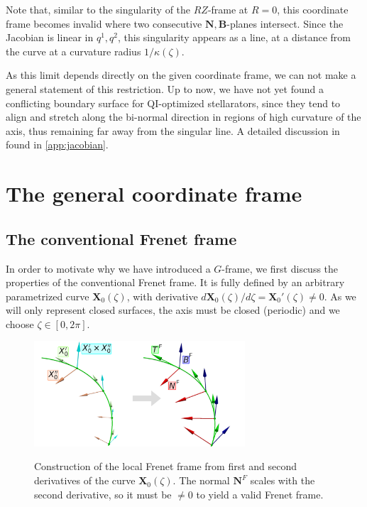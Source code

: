 \documentclass[12pt]{iopart}
\newcommand\hladdedrev[1]{#1} %
\newcommand\hlchangedrev[1]{#1} %
\newcommand\X{{\bm{X}}_0}
\newcommand\Xp{\X'}
\newcommand\Nfrenet{{\bm N}^F}
\newcommand\Nnew{{\bm N}}
\newcommand\Bnew{{\bm B}}
\newcommand\GFF{$G$-frame}
\newcommand\RZF{$RZ$-frame}
\newcommand\NBplanes[1]{$\Nnew,\Bnew$-planes{#1}}
\newcommand\binormal[1]{bi-normal{#1}}
\begin{document}
\hlchangedrev{Note that, similar to the singularity of the \RZF{} at $R=0$, this coordinate frame becomes invalid where two consecutive \NBplanes{ } intersect. Since the Jacobian is linear in $q^1,q^2$, this singularity appears as a line, at a distance from the curve at a curvature radius $1/\kappa(\zeta)$. } 

\hladdedrev{As this limit depends directly on the given coordinate frame, we can not make a general statement of this restriction. Up to now, we have not yet found a conflicting boundary surface for QI-optimized stellarators, since they tend to align and stretch along the \binormal{ } direction in regions of high curvature of the axis, thus remaining far away from the singular line. A detailed discussion in found in \ref{app:jacobian}.}

\section{The \hlchangedrev{general coordinate} frame \label{sec:gff}}
\subsection{\hladdedrev{The conventional Frenet frame \label{sec:conventional_frenet}}}
In order to motivate why we have introduced a \GFF{}, we first discuss the properties of the conventional Frenet frame.
It is fully defined by an arbitrary parametrized curve $\X(\zeta)$, \hladdedrev{with derivative $d\X(\zeta)/d\zeta = \Xp(\zeta) \not= 0$}. As we will only represent closed surfaces, the axis must be closed (periodic) and we choose $\zeta\in[0,2\pi]$.  
%
\begin{figure}[htbp!]
    \centering
    \includegraphics[trim=30 0 0 0,clip,width=0.7\textwidth]{pics/explain_frenet/construct_frenet_new.png} \\
    \caption{Construction of the local Frenet frame from first and second derivatives of the curve $\X(\zeta)$. \hlchangedrev{The normal $\Nfrenet$ scales with the second derivative, so it must be $\neq 0$ to yield a valid Frenet frame.}}
    \label{fig:construct_frenet}
\end{figure}
\end{document}
